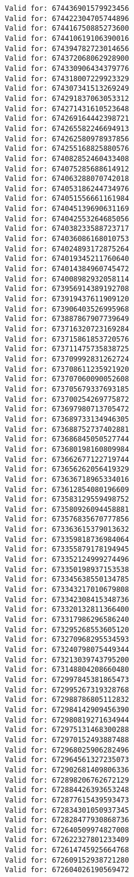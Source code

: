 \documentclass[11pt]{article}
\begin{document}
\begin{Verbatim}[commandchars=\\\{\}]
Valid for: 674436901579923456
Valid for: 674422304705744896
Valid for: 674416750885273600
Valid for: 674410619106390016
Valid for: 674394782723014656
Valid for: 674372068062928900
Valid for: 674330906434379776
Valid for: 674318007229923329
Valid for: 674307341513269249
Valid for: 674291837063053312
Valid for: 674271431610523648
Valid for: 674269164442398721
Valid for: 674265582246694913
Valid for: 674262580978937856
Valid for: 674255168825880576
Valid for: 674082852460433408
Valid for: 674075285688614912
Valid for: 674063288070742018
Valid for: 674053186244734976
Valid for: 674051556661161984
Valid for: 674045139690631169
Valid for: 674042553264685056
Valid for: 674038233588723717
Valid for: 674036086168010753
Valid for: 674024893172875264
Valid for: 674019345211760640
Valid for: 674014384960745472
Valid for: 674008982932058114
Valid for: 673956914389192708
Valid for: 673919437611909120
Valid for: 673906403526995968
Valid for: 673887867907739649
Valid for: 673716320723169284
Valid for: 673715861853720576
Valid for: 673711475735838725
Valid for: 673709992831262724
Valid for: 673708611235921920
Valid for: 673707060090052608
Valid for: 673705679337693185
Valid for: 673700254269775872
Valid for: 673697980713705472
Valid for: 673689733134946305
Valid for: 673688752737402881
Valid for: 673686845050527744
Valid for: 673680198160809984
Valid for: 673662677122719744
Valid for: 673656262056419329
Valid for: 673636718965334016
Valid for: 673612854080196609
Valid for: 673583129559498752
Valid for: 673580926094458881
Valid for: 673576835670777856
Valid for: 673363615379013632
Valid for: 673359818736984064
Valid for: 673355879178194945
Valid for: 673352124999274496
Valid for: 673350198937153538
Valid for: 673345638550134785
Valid for: 673343217010679808
Valid for: 673342308415348736
Valid for: 673320132811366400
Valid for: 673317986296586240
Valid for: 673295268553605120
Valid for: 673270968295534593
Valid for: 673240798075449344
Valid for: 673213039743795200
Valid for: 673148804208660480
Valid for: 672997845381865473
Valid for: 672995267319328768
Valid for: 672988786805112832
Valid for: 672984142909456390
Valid for: 672980819271634944
Valid for: 672975131468300288
Valid for: 672970152493887488
Valid for: 672968025906282496
Valid for: 672964561327235073
Valid for: 672902681409806336
Valid for: 672898206762672129
Valid for: 672884426393653248
Valid for: 672877615439593473
Valid for: 672834301050937345
Valid for: 672828477930868736
Valid for: 672640509974827008
Valid for: 672622327801233409
Valid for: 672614745925664768
Valid for: 672609152938721280
Valid for: 672604026190569472

\end{Verbatim}
\end{document}
